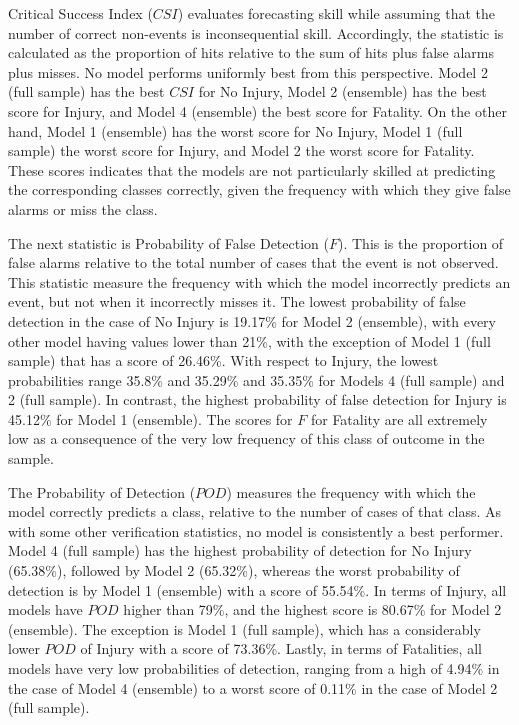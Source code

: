 \documentclass[]{elsarticle} %
\begin{document}
Critical Success Index (\(CSI\)) evaluates forecasting skill while
assuming that the number of correct non-events is inconsequential skill.
Accordingly, the statistic is calculated as the proportion of hits
relative to the sum of hits plus false alarms plus misses. No model
performs uniformly best from this perspective. Model 2 (full sample) has
the best \(CSI\) for No Injury, Model 2 (ensemble) has the best score
for Injury, and Model 4 (ensemble) the best score for Fatality. On the
other hand, Model 1 (ensemble) has the worst score for No Injury, Model
1 (full sample) the worst score for Injury, and Model 2 the worst score
for Fatality. These scores indicates that the models are not
particularly skilled at predicting the corresponding classes correctly,
given the frequency with which they give false alarms or miss the class.

The next statistic is Probability of False Detection (\(F\)). This is
the proportion of false alarms relative to the total number of cases
that the event is not observed. This statistic measure the frequency
with which the model incorrectly predicts an event, but not when it
incorrectly misses it. The lowest probability of false detection in the
case of No Injury is 19.17\% for Model 2 (ensemble), with every other
model having values lower than 21\%, with the exception of Model 1 (full
sample) that has a score of 26.46\%. With respect to Injury, the lowest
probabilities range 35.8\% and 35.29\% and 35.35\% for Models 4 (full
sample) and 2 (full sample). In contrast, the highest probability of
false detection for Injury is 45.12\% for Model 1 (ensemble). The scores
for \(F\) for Fatality are all extremely low as a consequence of the
very low frequency of this class of outcome in the sample.

The Probability of Detection (\(POD\)) measures the frequency with which
the model correctly predicts a class, relative to the number of cases of
that class. As with some other verification statistics, no model is
consistently a best performer. Model 4 (full sample) has the highest
probability of detection for No Injury (65.38\%), followed by Model 2
(65.32\%), whereas the worst probability of detection is by Model 1
(ensemble) with a score of 55.54\%. In terms of Injury, all models have
\(POD\) higher than 79\%, and the highest score is 80.67\% for Model 2
(ensemble). The exception is Model 1 (full sample), which has a
considerably lower \(POD\) of Injury with a score of 73.36\%. Lastly, in
terms of Fatalities, all models have very low probabilities of
detection, ranging from a high of 4.94\% in the case of Model 4
(ensemble) to a worst score of 0.11\% in the case of Model 2 (full
sample).
\end{document}
